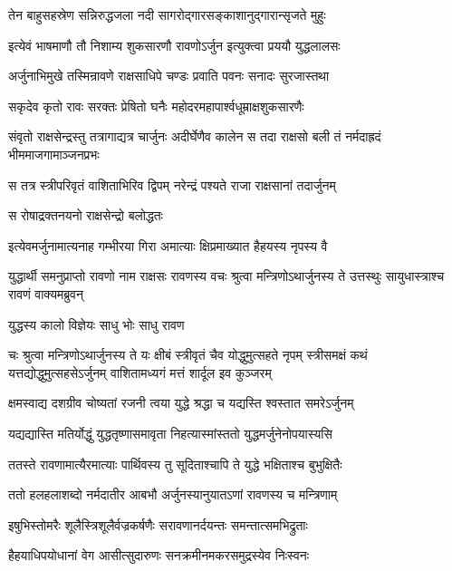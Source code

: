 \twolineshloka
{तेन बाहुसहस्रेण सन्निरुद्धजला नदी}
{सागरोद्गारसङ्काशानुद्गारान्सृजते मुहुः} %

\twolineshloka
{इत्येवं भाषमाणौ तौ निशाम्य शुकसारणौ}
{रावणोऽर्जुन इत्युक्त्वा प्रययौ युद्धलालसः} %

\twolineshloka
{अर्जुनाभिमुखे तस्मिन्रावणे राक्षसाधिपे}
{चण्डः प्रवाति पवनः सनादः सुरजास्तथा} %

\twolineshloka
{सकृदेव कृतो रावः सरक्तः प्रेषितो घनैः}
{महोदरमहापार्श्वधूम्राक्षशुकसारणैः} %

\threelineshloka
{संवृतो राक्षसेन्द्रस्तु तत्रागाद्यत्र चार्जुनः}
{अदीर्घेणैव कालेन स तदा राक्षसो बली}
{तं नर्मदाह्रदं भीममाजगामाञ्जनप्रभः} %

\twolineshloka
{स तत्र स्त्रीपरिवृतं वाशिताभिरिव द्विपम्}
{नरेन्द्रं पश्यते राजा राक्षसानां तदार्जुनम्} %

\onelineshloka
{स रोषाद्रक्तनयनो राक्षसेन्द्रो बलोद्धतः} %

\twolineshloka
{इत्येवमर्जुनामात्यनाह गम्भीरया गिरा}
{अमात्याः क्षिप्रमाख्यात हैहयस्य नृपस्य वै} %

\threelineshloka
{युद्धार्थी समनुप्राप्तो रावणो नाम राक्षसः}
{रावणस्य वचः श्रुत्वा मन्त्रिणोऽथार्जुनस्य ते}
{उत्तस्थुः सायुधास्त्राश्च रावणं वाक्यमब्रुवन्} %

\onelineshloka
{युद्धस्य कालो विज्ञेयः साधु भोः साधु रावण} %

\fourlineindentedshloka
{चः श्रुत्वा मन्त्रिणोऽथार्जुनस्य ते}
{यः क्षीबं स्त्रीवृतं चैव योद्धुमुत्सहते नृपम्}
{स्त्रीसमक्षं कथं यत्तद्योद्धुमुत्सहसेऽर्जुनम्}
{वाशितामध्यगं मत्तं शार्दूल इव कुञ्जरम्} %

\twolineshloka
{क्षमस्वाद्य दशग्रीव चोष्यतां रजनी त्वया}
{युद्धे श्रद्धा च यद्यस्ति श्वस्तात समरेऽर्जुनम्} %

\twolineshloka
{यद्यद्यास्ति मतिर्योद्धुं युद्धतृष्णासमावृता}
{निहत्यास्मांस्ततो युद्धमर्जुनेनोपयास्यसि} %

\twolineshloka
{ततस्ते रावणामात्यैरमात्याः पार्थिवस्य तु}
{सूदिताश्चापि ते युद्धे भक्षिताश्च बुभुक्षितैः} %

\twolineshloka
{ततो हलहलाशब्दो नर्मदातीर आबभौ}
{अर्जुनस्यानुयातऽणां रावणस्य च मन्त्रिणाम्} %

\twolineshloka
{इषुभिस्तोमरैः शूलैस्त्रिशूलैर्वज्रकर्षणैः}
{सरावणानर्दयन्तः समन्तात्समभिद्रुताः} %

\twolineshloka
{हैहयाधिपयोधानां वेग आसीत्सुदारुणः}
{सनक्रमीनमकरसमुद्रस्येव निःस्वनः} %

